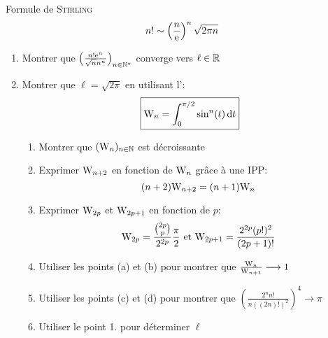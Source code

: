 \begin{box_titre}{Formule de \textsc{Stirling}}
    $$n! \sim \left(\frac{n}{\mathrm{e}}\right)^n \sqrt{2 \pi n}$$
\end{box_titre}

\begin{preuve}
    \begin{enumerate}
        \item Montrer que $\left( \frac{n!\mathrm{e}^n}{\sqrt{n}n^n} \right)_{n \in \mathbb{N}^\star}$ converge vers $\ell \in \mathbb{R}$
        \item Montrer que $\ell = \sqrt{2 \pi}$ en utilisant l':
        $$\boxed{\mathrm{W}_n = \int_{0}^{\pi/2}\sin^n(t) \, \mathrm{d} t}$$
        \begin{enumerate}
            \item Montrer que $(\mathrm{W}_n)_{n \in \mathbb{N}}$ est décroissante
            \item Exprimer $\mathrm{W}_{n+2}$ en fonction de $\mathrm{W}_n$ grâce à une IPP: $$(n+2)\mathrm{W}_{n+2} = (n+1)\mathrm{W}_n$$
            \item Exprimer $\mathrm{W}_{2p}$ et $\mathrm{W}_{2p+1}$ en fonction de $p$:\\
            $$\mathrm{W}_{2p} = \frac{\binom{2p}{p}}{2^{2p}}\frac{\pi}{2} \text{ et } \mathrm{W}_{2p+1} = \frac{2^{2p} (p!)^2}{(2p+1)!}$$
            \item Utiliser les points (a) et (b) pour montrer que $\frac{\mathrm{W}_n}{\mathrm{W}_{n+1}} \longrightarrow 1$
            \item Utiliser les points (c) et (d) pour montrer que $\left ( \frac{2^n n!}{n ((2n)!)^2} \right)^4 \longrightarrow \pi$
            \item Utiliser le point 1. pour déterminer $\ell$
        \end{enumerate}
    \end{enumerate}
\end{preuve}
